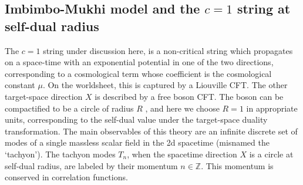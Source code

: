 \documentclass[english]{article}
\let\mb=\mathbb
\begin{document}

\subsection{Imbimbo-Mukhi model and the $c=1$ string at self-dual radius} \label{sec:IMc=1}

The $c=1$ string under discussion here, is a non-critical string which propagates on a space-time with an exponential potential in one of the two directions, corresponding to a cosmological term whose coefficient is the cosmological constant $\mu$. On the worldsheet, this is captured by a Liouville CFT. The other target-space direction $X$ is described by a free boson CFT. The boson can be compactified to be a circle of radius $R$ \cite{grossKlc=1}, and here we choose $R=1$ in appropriate units, corresponding to the self-dual value under the target-space duality transformation. The main observables of this theory are an infinite discrete set of modes of a single massless scalar field in the 2d spacetime (misnamed the `tachyon'). The tachyon modes $T_n$, when the spacetime direction $X$ is a circle at self-dual radius, are labeled by their momentum $n\in \mb{Z}$. This momentum is conserved in correlation functions.
\end{document}
